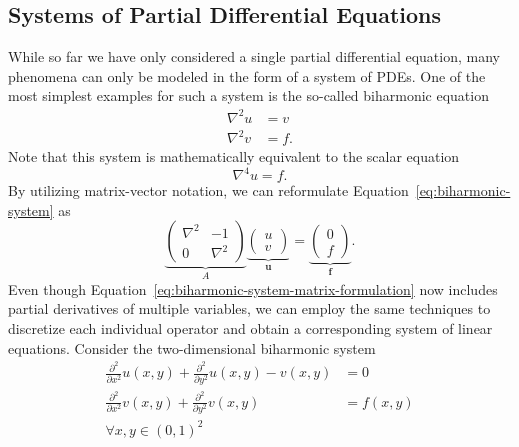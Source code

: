 \subsection{Systems of Partial Differential Equations}
\label{subsec:systems-of-pdes}
While so far we have only considered a single partial differential equation, many phenomena can only be modeled in the form of a system of PDEs.
One of the most simplest examples for such a system is the so-called biharmonic equation
\begin{equation}
	\begin{split}
		\nabla^2 u & = v  \\
		\nabla^2 v & = f.
	\end{split}
\label{eq:biharmonic-system}
\end{equation}
Note that this system is mathematically equivalent to the scalar equation 
\begin{equation}
	\nabla^4 u = f.
\end{equation}
By utilizing matrix-vector notation, we can reformulate Equation~\eqref{eq:biharmonic-system} as
\begin{equation}
	\underbrace{
	\begin{pmatrix}
		\nabla^2 & -1 \\
		0 & \nabla^2
	\end{pmatrix}}_{A}
\underbrace{ 
	\begin{pmatrix}
		u \\ v
	\end{pmatrix}
}_{\bm{u}}
=
\underbrace{
\begin{pmatrix}
	0 \\ f
\end{pmatrix}
}_{\bm{f}}.
\label{eq:biharmonic-system-matrix-formulation}
\end{equation}
Even though Equation~\eqref{eq:biharmonic-system-matrix-formulation} now includes partial derivatives of multiple variables, we can employ the same techniques to discretize each individual operator and obtain a corresponding system of linear equations. 
Consider the two-dimensional biharmonic system
\begin{equation}
	\begin{split}
		\frac{\partial^2}{\partial x^2} u(x,y) + \frac{\partial^2}{\partial y^2} u(x,y) - v(x, y) & = 0 \\
		\frac{\partial^2}{\partial x^2} v(x,y) + \frac{\partial^2}{\partial y^2} v(x,y) & = f(x, y) \\ \forall x, y \in (0, 1)^2
	\end{split}
	\label{eq:2D-biharmonic-system}
\end{equation}
